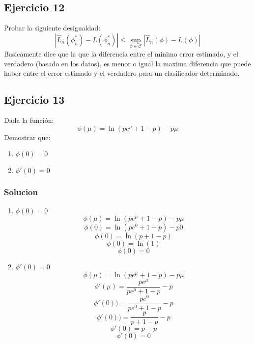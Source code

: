 \documentclass[12pt, a4paper]{article}
\begin{document}
\subsection{Ejercicio 12}
Probar la siguiente desigualdad:
		$$|\widehat{L}_n(\phi_n^*)-L(\phi_n^*)| \leq \sup\limits_{\phi \in \mathscr{C}}|\widehat{L}_n(\phi)-L(\phi)| $$
Basicamente dice que la que la diferencia entre el minimo error estimado, y el verdadero (basado en los datos), es menor  o igual la maxima diferencia que puede haber entre el error estimado y el verdadero para un clasificador determinado.


\subsection{Ejercicio 13}
Dada la función:
		$$\phi(\mu) = \ln(pe^\mu + 1 - p)- p\mu$$
Demostrar que:
\begin{enumerate}
	\item $\phi(0) = 0$
	\item $\phi'(0) = 0$
\end{enumerate}
\subsubsection{Solucion}
\begin{enumerate}
	\item $\phi(0) = 0$
	$$\phi(\mu) = \ln(pe^\mu + 1 - p)- p\mu$$
	$$\phi(0) = \ln(pe^0 + 1 - p)- p0$$
	$$\phi(0) = \ln(p+1-p)$$
	$$\phi(0) = \ln(1)$$
	$$\phi(0) = 0$$
	\item $\phi'(0) = 0$
		$$\phi(\mu) = \ln(pe^\mu + 1 - p)- p\mu$$
		$$\phi'(\mu) = \frac{pe^\mu}{pe^\mu + 1 - p}-p$$
		$$\phi'(0)) = \frac{pe^0}{pe^0 + 1 - p}-p $$
		$$\phi'(0)) = \frac{p}{p+1-p}-p$$
		$$\phi'(0) = p-p$$
		$$\phi'(0) = 0$$
\end{enumerate}
\end{document}
